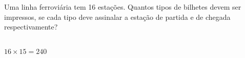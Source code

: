 \begin{ex}
 Uma linha ferroviária tem 16 estações. Quantos tipos de bilhetes devem ser impressos, se cada tipo deve assinalar a estação de partida e de chegada respectivamente?
   \begin{sol}
      \phantom{A} \\
      $16 \times 15=240$
   \end{sol}
\end{ex}